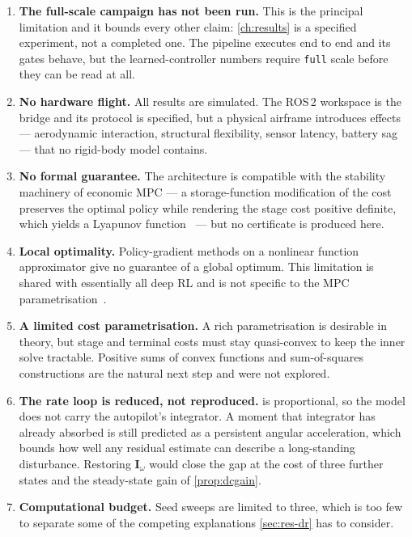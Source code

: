 \documentclass[11pt,a4paper,twoside,openright]{report}
\renewcommand{\vec}[1]{\bm{#1}}
\theoremstyle{plain}
\theoremstyle{definition}
\theoremstyle{remark}
\begin{document}
	\begin{enumerate}[leftmargin=*]
		\item \textbf{The full-scale campaign has not been run.} This is the principal
		limitation and it bounds every other claim: \cref{ch:results} is a specified
		experiment, not a completed one. The pipeline executes end to end and its
		gates behave, but the learned-controller numbers require \texttt{full} scale
		before they can be read at all.
		\item \textbf{No hardware flight.} All results are simulated. The ROS\,2
		workspace is the bridge and its protocol is specified, but a physical airframe
		introduces effects --- aerodynamic interaction, structural flexibility, sensor
		latency, battery sag --- that no rigid-body model contains.
		\item \textbf{No formal guarantee.} The architecture is compatible with the
		stability machinery of economic MPC --- a storage-function modification of the
		cost preserves the optimal policy while rendering the stage cost positive
		definite, which yields a Lyapunov function~\cite{diehl2011lyapunov,
			angeli2012average} --- but no certificate is produced here.
		\item \textbf{Local optimality.} Policy-gradient methods on a nonlinear function
		approximator give no guarantee of a global optimum. This limitation is shared
		with essentially all deep RL and is not specific to the MPC
		parametrisation~\cite{gros2020data}.
		\item \textbf{A limited cost parametrisation.} A rich parametrisation is
		desirable in theory, but stage and terminal costs must stay quasi-convex to
		keep the inner solve tractable. Positive sums of convex functions and
		sum-of-squares constructions are the natural next step and were not explored.
		\item \textbf{The rate loop is reduced, not reproduced.} 
		is proportional, so the model does not carry the autopilot's integrator. A
		moment that integrator has already absorbed is still predicted as a persistent
		angular acceleration, which bounds how well any residual estimate can describe
		a long-standing disturbance. Restoring $\vec I_\omega$ would close the gap at
		the cost of three further states and the steady-state gain of
		\cref{prop:dcgain}.
		\item \textbf{Computational budget.} Seed sweeps are limited to three, which is
		too few to separate some of the competing explanations \cref{sec:res-dr} has
		to consider.
	\end{enumerate}
\end{document}
